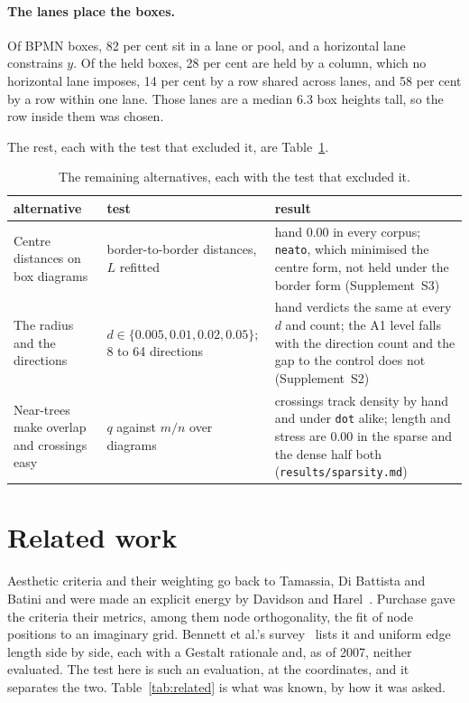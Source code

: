 \documentclass[11pt]{article}
\begin{document}
\paragraph{The lanes place the boxes.} Of BPMN boxes, 82 per cent sit in a lane or pool,
and a horizontal lane constrains $y$. Of the held boxes, 28 per cent are held by a column,
which no horizontal lane imposes, 14 per cent by a row shared across lanes, and 58 per cent
by a row within one lane. Those lanes are a median 6.3 box heights tall, so the row inside
them was chosen.

The rest, each with the test that excluded it, are Table~\ref{tab:alternatives}.

\begin{table}[!htbp]\centering\small
\begin{tabular}{@{}>{\raggedright\arraybackslash}p{2.6cm}>{\raggedright\arraybackslash}p{4.2cm}>{\raggedright\arraybackslash}p{7.5cm}@{}}
\toprule
alternative & test & result \\
\midrule
Centre distances on box diagrams & border-to-border distances, $L$ refitted & hand 0.00 in every corpus; \texttt{neato}, which minimised the centre form, not held under the border form (Supplement~S3) \\[2pt]
The radius and the directions & $d \in \{0.005, 0.01, 0.02, 0.05\}$; 8 to 64 directions & hand verdicts the same at every $d$ and count; the A1 level falls with the direction count and the gap to the control does not (Supplement~S2) \\[2pt]
Near-trees make overlap and crossings easy & $q$ against $m/n$ over diagrams & crossings track density by hand and under \texttt{dot} alike; length and stress are 0.00 in the sparse and the dense half both (\texttt{results/sparsity.md}) \\[2pt]
\bottomrule
\end{tabular}
\caption{The remaining alternatives, each with the test that excluded it.}
\label{tab:alternatives}
\end{table}

\section{Related work}\label{sec:related}

Aesthetic criteria and their weighting go back to Tamassia, Di Battista and Batini
\cite{tdb88} and were made an explicit energy by Davidson and Harel~\cite{dh96}. Purchase
\cite{purchase02} gave the criteria their metrics, among them node orthogonality, the fit
of node positions to an imaginary grid. Bennett et al.'s survey~\cite{bennett07} lists it
and uniform edge length side by side, each with a Gestalt rationale and, as of 2007,
neither evaluated. The test here is such an evaluation, at the coordinates, and it
separates the two. Table~\ref{tab:related} is what was known, by how it was asked.
\end{document}
